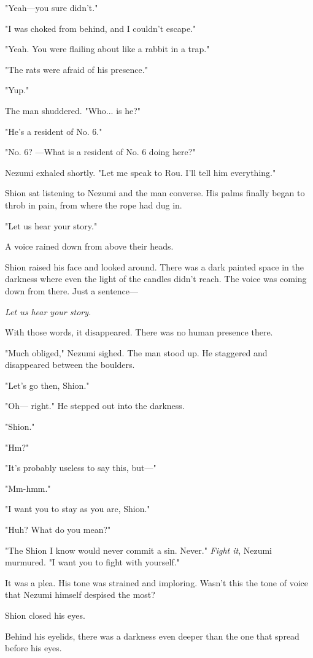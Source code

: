 "Yeah---you sure didn't."

"I was choked from behind, and I couldn't escape."

"Yeah. You were flailing about like a rabbit in a trap."

"The rats were afraid of his presence."

"Yup."

The man shuddered. "Who... is he?"

"He's a resident of No. 6."

"No. 6? ---What is a resident of No. 6 doing here?"

Nezumi exhaled shortly. "Let me speak to Rou. I'll tell him everything."

Shion sat listening to Nezumi and the man converse. His palms finally
began to throb in pain, from where the rope had dug in.

"Let us hear your story."

A voice rained down from above their heads.

Shion raised his face and looked around. There was a dark painted space
in the darkness where even the light of the candles didn't reach. The
voice was coming down from there. Just a sentence---

\emph{Let us hear your story.}

With those words, it disappeared. There was no human presence there.

"Much obliged," Nezumi sighed. The man stood up. He staggered and
disappeared between the boulders.

"Let's go then, Shion."

"Oh--- right." He stepped out into the darkness.

"Shion."

"Hm?"

"It's probably useless to say this, but---"

"Mm-hmm."

"I want you to stay as you are, Shion."

"Huh? What do you mean?"

"The Shion I know would never commit a sin. Never." \emph{Fight it}, Nezumi
murmured. "I want you to fight with yourself."

It was a plea. His tone was strained and imploring. Wasn't this the tone
of voice that Nezumi himself despised the most?

Shion closed his eyes.

Behind his eyelids, there was a darkness even deeper than the one that
spread before his eyes.